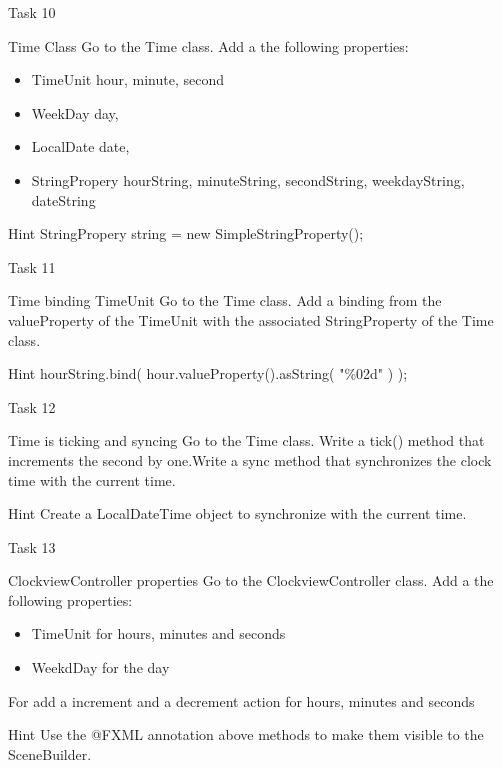 \begin{frame}{Task 10}
\begin{block}{Time Class}
Go to the Time class. Add a the following properties:
 \begin{itemize}
 \item TimeUnit hour, minute, second
 \item WeekDay day, 
 \item LocalDate date,
 \item StringPropery hourString, minuteString, secondString, weekdayString, dateString
 \end{itemize}
\end{block}
\pause
\begin{exampleblock}{Hint}
StringPropery string = new SimpleStringProperty();
\end{exampleblock}
\end{frame}
\begin{frame}{Task 11}
\begin{block}{Time binding TimeUnit}
Go to the Time class. Add a binding from the valueProperty of the TimeUnit with the associated StringProperty of the Time class.
\end{block}
\pause
\begin{exampleblock}{Hint}
 hourString.bind( hour.valueProperty().asString( "\%02d" ) );
\end{exampleblock}
\end{frame}
\begin{frame}{Task 12}
\begin{block}{Time is ticking and syncing}
Go to the Time class. Write a tick() method that increments the second by one.Write a sync method that synchronizes the clock time with the current time.
\end{block}
\pause
\begin{exampleblock}{Hint}
Create a LocalDateTime object to synchronize with the current time. 
\end{exampleblock}
\end{frame}
\begin{frame}{Task 13}
\begin{block}{ClockviewController properties}
Go to the ClockviewController class. Add a the following properties:
\begin{itemize}
\item TimeUnit for hours, minutes and seconds
\item WeekdDay for the day
\end{itemize}
For add a increment and a decrement action for  hours, minutes and seconds
\end{block}
\pause
\begin{exampleblock}{Hint}
Use the @FXML annotation above methods to make them visible to the SceneBuilder.
\end{exampleblock}
\end{frame}
